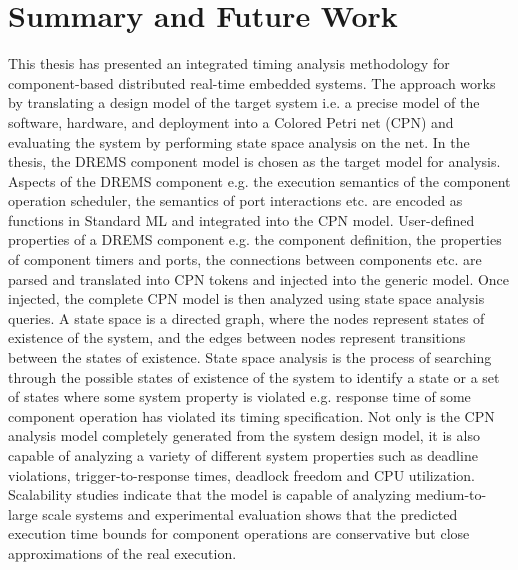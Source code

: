 \chapter{Summary and Future Work}
\label{chapter:conclusion}

This thesis has presented an integrated timing analysis methodology for component-based distributed real-time embedded systems. The approach works by translating a design model of the target system i.e. a precise model of the software, hardware, and deployment into a Colored Petri net (CPN) and evaluating the system by performing state space analysis on the net. In the thesis, the DREMS component model is chosen as the target model for analysis. Aspects of the DREMS component e.g. the execution semantics of the component operation scheduler, the semantics of port interactions etc. are encoded as functions in Standard ML and integrated into the CPN model. User-defined properties of a DREMS component e.g. the component definition, the properties of component timers and ports, the connections between components etc. are parsed and translated into CPN tokens and injected into the generic model. Once injected, the complete CPN model is then analyzed using state space analysis queries. A state space is a directed graph, where the nodes represent states of existence of the system, and the edges between nodes represent transitions between the states of existence. State space analysis is the process of searching through the possible states of existence of the system to identify a state or a set of states where some system property is violated e.g. response time of some component operation has violated its timing specification. Not only is the CPN analysis model completely generated from the system design model, it is also capable of analyzing a variety of different system properties such as deadline violations, trigger-to-response times, deadlock freedom and CPU utilization. Scalability studies indicate that the model is capable of analyzing medium-to-large scale systems and experimental evaluation shows that the predicted execution time bounds for component operations are conservative but close approximations of the real execution.

